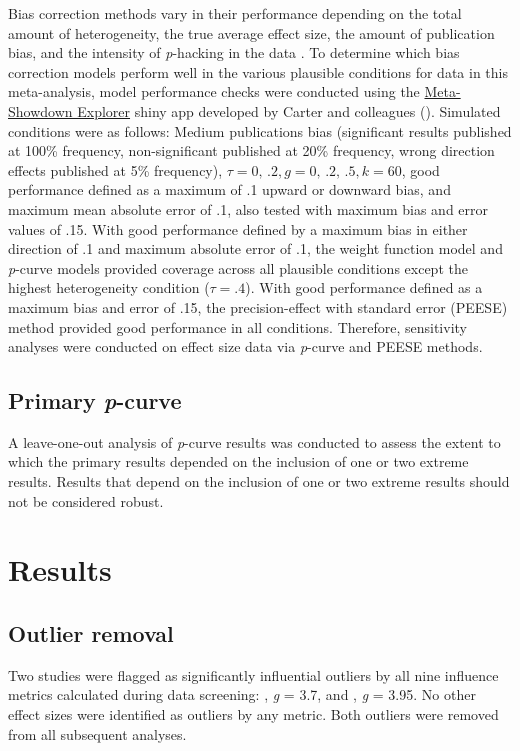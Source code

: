 \documentclass[man,floatsintext,hidelinks]{apa7}
\begin{document}
Bias correction methods vary in their performance depending on the total amount of heterogeneity, the true average effect size, the amount of publication bias, and the intensity of \emph{p}-hacking in the data \parencite{Carter2019-vv}. To determine which bias correction models perform well in the various plausible conditions for data in this meta-analysis, model performance checks were conducted using the \href{http://www.shinyapps.org/apps/metaExplorer/}{Meta-Showdown Explorer} shiny app developed by Carter and colleagues (\citeyear{Carter2019-vv}). Simulated conditions were as follows: Medium publications bias (significant results published at 100\% frequency, non-significant published at 20\% frequency, wrong direction effects published at 5\% frequency), $\tau = 0, \,.2, g = 0, \,.2, \,.5, k = 60$, good performance defined as a maximum of .1 upward or downward bias, and maximum mean absolute error of .1, also tested with maximum bias and error values of .15. With good performance defined by a maximum bias in either direction of .1 and maximum absolute error of .1, the weight function model and \emph{p}-curve models provided coverage across all plausible conditions except the highest heterogeneity condition ($\tau = .4$). With good performance defined as a maximum bias and error of .15, the precision-effect with standard error (PEESE) method provided good performance in all conditions. Therefore, sensitivity analyses were conducted on effect size data via \emph{p}-curve and PEESE methods.

\subsection{Primary \emph{p}-curve}
A leave-one-out analysis of \emph{p}-curve results was conducted to assess the extent to which the primary results depended on the inclusion of one or two extreme results. Results that depend on the inclusion of one or two extreme results should not be considered robust.

\section{Results}
\subsection{Outlier removal}
Two studies were flagged as significantly influential outliers by all nine influence metrics calculated during data screening: \Textcite{Lemos2017-qx}, \emph{g} = 3.7, and \Textcite{Marques2017-ue}, \emph{g} = 3.95. No other effect sizes were identified as outliers by any metric. Both outliers were removed from all subsequent analyses.
\end{document}
